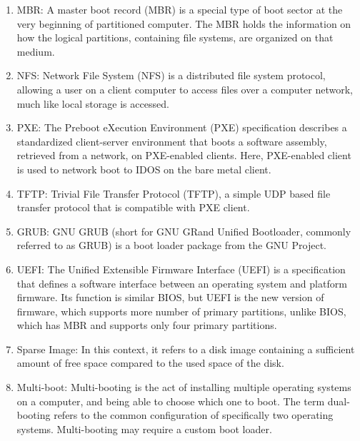 \documentclass[a4paper,12pt]{article}
\begin{document}
\begin{enumerate}
     \item MBR: A master boot record (MBR) is a special type of boot sector at the very beginning of partitioned computer. The MBR holds the information on how the logical partitions, containing file systems, are organized on that medium.
    \item NFS: Network File System (NFS) is a distributed file system protocol, allowing a user on a client computer to access files over a computer network, much like local storage is accessed.
    \item PXE: The Preboot eXecution Environment (PXE) specification describes a standardized client-server environment that boots a software assembly, retrieved from a network, on PXE-enabled clients. Here, PXE-enabled client is used to network boot to IDOS on the bare metal client.
    \item TFTP: Trivial File Transfer Protocol (TFTP), a simple UDP based file transfer protocol that is compatible with PXE client.
    \item GRUB: GNU GRUB (short for GNU GRand Unified Bootloader, commonly referred to as GRUB) is a boot loader package from the GNU Project. 
    \item UEFI: The Unified Extensible Firmware Interface (UEFI) is a specification that defines a software interface between an operating system and platform firmware. Its function is similar BIOS, but UEFI is the new version of firmware, which supports more number of primary partitions, unlike  BIOS, which has MBR and supports only four primary partitions.
    \item Sparse Image: In this context, it refers to a disk image containing a sufficient amount of free space compared to the used space of the disk.
    \item Multi-boot: Multi-booting is the act of installing multiple operating systems on a computer, and being able to choose which one to boot. The term dual-booting refers to the common configuration of specifically two operating systems. Multi-booting may require a custom boot loader. 
\end{enumerate}
\newpage
\end{document}
